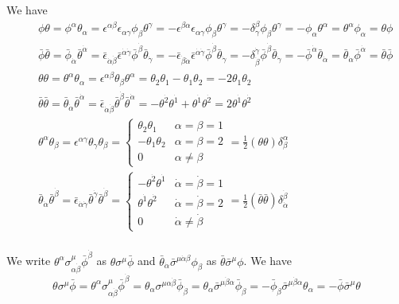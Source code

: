 \documentclass[12pt]{book}
\begin{document}
	We have
	\begin{eqnarray}
		&&\phi\theta=\phi^\alpha\theta_\alpha=\epsilon^{\alpha\beta}\epsilon_{\alpha\gamma}\phi_\beta\theta^\gamma=-\epsilon^{\beta\alpha}\epsilon_{\alpha\gamma}\phi_\beta\theta^\gamma=-\delta^\beta_\gamma\phi_\beta\theta^\gamma=-\phi_\alpha\theta^\alpha=\theta^\alpha\phi_\alpha=\theta\phi\\
		&&\bar\phi\bar\theta=\bar\phi_{\dot\alpha}\bar\theta^{\dot\alpha}=\bar\epsilon_{\dot\alpha\dot\beta}\bar\epsilon^{\dot\alpha\dot\gamma}\bar\phi^{\dot\beta}\bar\theta_{\dot\gamma}=-\bar\epsilon_{\dot\beta\dot\alpha}\bar\epsilon^{\dot\alpha\dot\gamma}\bar\phi^{\dot\beta}\bar\theta_{\dot\gamma}=-\delta_{\dot\beta}^{\dot\gamma}\bar\phi^{\dot\beta}\bar\theta_{\dot\gamma}=-\bar\phi^{\dot\alpha}\bar\theta_{\dot\alpha}=\bar\theta_{\dot\alpha}\bar\phi^{\dot\alpha}=\bar\theta\bar\phi\\
		&&\theta\theta=\theta^\alpha\theta_\alpha=\epsilon^{\alpha\beta}\theta_\beta\theta^\alpha=\theta_2\theta_1-\theta_1\theta_2=-2\theta_1\theta_2\\
		&&\bar\theta\bar\theta=\bar\theta_{\dot\alpha}\bar\theta^{\dot\alpha}=\bar\epsilon_{\dot\alpha\dot\beta}\bar\theta^{\dot\beta}\bar\theta^{\dot\alpha}=-\theta^{\dot 2}\theta^{\dot 1}+\theta^{\dot 1}\theta^{\dot 2}=2\theta^{\dot 1}\theta^{\dot 2}\\
		&&\theta^\alpha\theta_\beta=\epsilon^{\alpha\gamma}\theta_\gamma\theta_\beta=\left\{\begin{array}{ll}
			\theta_2\theta_1&\alpha=\beta=1\\
			-\theta_1\theta_2&\alpha=\beta=2\\
			0&\alpha\neq\beta
		\end{array}\right.=\frac 12(\theta\theta)\delta^\alpha_\beta\\
		&&\bar\theta_{\dot\alpha}\bar\theta^{\dot\beta}=\bar\epsilon_{\dot\alpha\dot\gamma}\bar\theta^{\dot\gamma}\bar\theta^{\dot\beta}=\left\{\begin{array}{ll}
			-\theta^{\dot 2}\theta^{\dot 1}&\dot\alpha=\dot\beta=1\\
			\theta^{\dot 1}\theta^{\dot 2}&\dot\alpha=\dot\beta=2\\
			0&\dot\alpha\neq\dot\beta
		\end{array}\right.=\frac 12(\bar\theta\bar\theta)\delta_{\dot\alpha}^{\dot\beta}\\
	\end{eqnarray}
	
	We write $\theta^\alpha\sigma^\mu_{\alpha\dot\beta}\bar\phi^{\dot\beta}$ as $\theta\sigma^\mu\bar\phi$ and $\bar\theta_{\dot\alpha}\bar\sigma^{\mu\dot\alpha\beta}\phi_\beta$ as $\bar\theta\bar\sigma^\mu\phi$. We have
	\begin{equation}
		\theta\sigma^\mu\bar\phi=\theta^\alpha\sigma^\mu_{\alpha\dot\beta}\bar\phi^{\dot\beta}=\theta_\alpha\sigma^{\mu\alpha\dot\beta}\bar\phi_{\dot\beta}=\theta_\alpha\bar\sigma^{\mu\dot\beta\alpha}\bar\phi_{\dot\beta}
			=-\bar\phi_{\dot\beta}\bar\sigma^{\mu\dot\beta\alpha}\theta_\alpha
			=-\bar\phi\bar\sigma^\mu\theta
	\end{equation}
	
\end{document}
